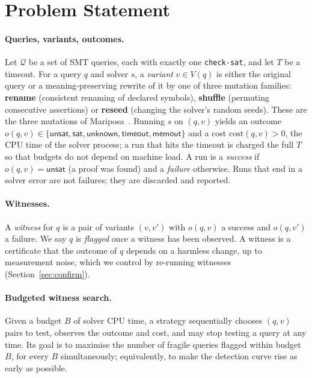 \documentclass[11pt]{article}
\newcommand{\unsat}{\textsf{unsat}}
\newcommand{\unknown}{\textsf{unknown}}
\newcommand{\timeout}{\textsf{timeout}}
\newcommand{\Q}{\mathcal{Q}}
\newcommand{\Cost}{\mathrm{cost}}
\begin{document}
\section{Problem Statement}
\label{sec:problem}

\paragraph{Queries, variants, outcomes.}
Let $\Q$ be a set of SMT queries, each with exactly one \texttt{check-sat}, and let $T$ be a timeout. For a query $q$ and solver $s$, a \emph{variant} $v\in V(q)$ is either the original query or a meaning-preserving rewrite of it by one of three mutation families: \textbf{rename} (consistent renaming of declared symbols), \textbf{shuffle} (permuting consecutive assertions) or \textbf{reseed} (changing the solver's random seeds). These are the three mutations of Mariposa~\cite{mariposa,track}. Running $s$ on $(q,v)$ yields an outcome $o(q,v)\in\{\unsat,\textsf{sat},\unknown,\timeout,\textsf{memout}\}$ and a cost $\Cost(q,v)>0$, the CPU time of the solver process; a run that hits the timeout is charged the full $T$ so that budgets do not depend on machine load. A run is a \emph{success} if $o(q,v)=\unsat$ (a proof was found) and a \emph{failure} otherwise. Runs that end in a solver error are not failures; they are discarded and reported.

\paragraph{Witnesses.}
A \emph{witness} for $q$ is a pair of variants $(v,v')$ with $o(q,v)$ a success and $o(q,v')$ a failure. We say $q$ is \emph{flagged} once a witness has been observed. A witness is a certificate that the outcome of $q$ depends on a harmless change, up to measurement noise, which we control by re-running witnesses (Section~\ref{sec:confirm}).

\paragraph{Budgeted witness search.}
Given a budget $B$ of solver CPU time, a strategy sequentially chooses $(q,v)$ pairs to test, observes the outcome and cost, and may stop testing a query at any time. Its goal is to maximise the number of fragile queries flagged within budget $B$, for every $B$ simultaneously; equivalently, to make the detection curve rise as early as possible.
\end{document}
